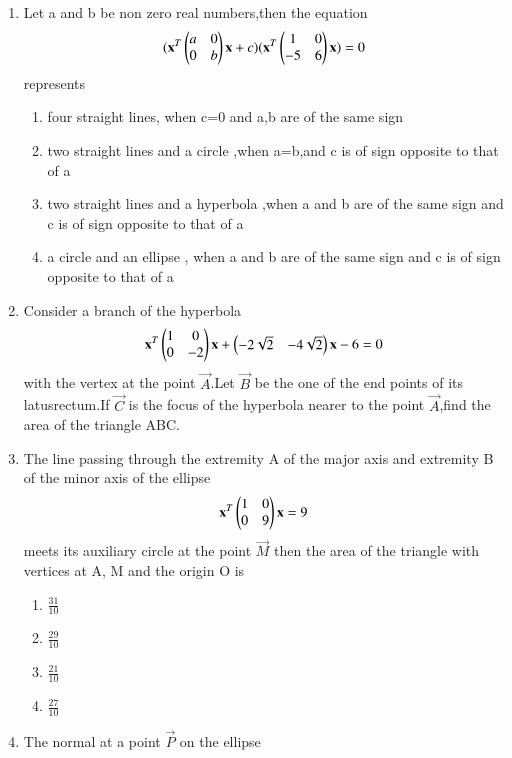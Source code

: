 \documentclass[journal,12pt,twocolumn]{IEEEtran}
\begin{document}
\begin{enumerate}[label=\arabic*]
    \item Let a and b be non zero real numbers,then the equation
    \begin{align}
    (\mathbf{x}^T\begin{pmatrix} a&0\\0&b \end{pmatrix}\mathbf{x}+c)(\mathbf{x}^T\begin{pmatrix}1&0\\-5&6\end{pmatrix} \mathbf{x})=0
    \end{align}represents
    \begin{enumerate}
    \item four straight lines, when c=0 and a,b are of the same sign 
    \item two straight lines and a circle ,when a=b,and c is of sign opposite to that of a
    \item two straight lines and a hyperbola ,when a and b are of the same sign and c is of sign 		opposite to that of a 
    \item a circle and an ellipse , when a and b are of the same sign and c is of sign opposite to that of a
    \end{enumerate}
    \item Consider a branch  of the hyperbola 
    \begin{align}
    \mathbf{x}^T\begin{pmatrix}1&0\\0&-2\end{pmatrix}\mathbf{x}+\begin{pmatrix}-2\sqrt{2}&-4\sqrt{2}\end{pmatrix}\mathbf{x}-6=0
    \end{align} with the vertex at the point $\vec{A}$.Let $\vec{B}$ be the one of the end points of 	its latusrectum.If $\vec{C}$ is the focus of the hyperbola nearer to the point $\vec{A}$,find the area of the triangle ABC.
    \item The line passing through the extremity A of the major axis and extremity B of the minor axis of the ellipse
    \begin{align}
    \mathbf{x}^T\begin{pmatrix}1&0\\0&9 \end{pmatrix}\mathbf{x} =9
    \end{align}
    meets its auxiliary circle at the point $\vec{M}$ then the area of the triangle with vertices at 	A, M and the origin O is
    \begin{enumerate}
    \item $\frac{31}{10}$
    \item $\frac{29}{10}$
    \item $\frac{21}{10}$
    \item $\frac{27}{10}$
    \end{enumerate}
    \item The normal at a point $\vec{P}$ on the ellipse 
    \begin{align}

\end{align}
\end{enumerate}
\end{document}
